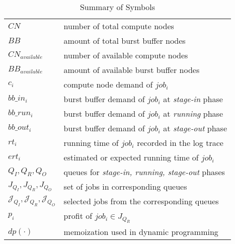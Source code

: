 

\begin{table}[h] 
        \renewcommand{\arraystretch}{1.3}
        \caption{Summary of Symbols}
        \label{Tab:Symbols}
        \centering
        \begin{tabular}{l|l}
                \hline
                $CN$ & number of total compute nodes \\
                $BB$ & amount of total burst buffer nodes \\
                $CN_{available}$ & number of available compute nodes \\
                $BB_{available}$ & amount of available burst buffer nodes \\
                $c_i$ & compute node demand of $job_i$ \\
                $bb\_in_i$ & burst buffer demand of $job_i$ at \textit{stage-in} phase \\
                $bb\_run_i$ & burst buffer demand of $job_i$ at \textit{running} phase \\
                $bb\_out_i$ & burst buffer demand of $job_i$ at \textit{stage-out} phase \\
                $rt_i$ & running time of $job_i$ recorded in the log trace \\
                $ert_i$ & estimated or expected running time of $job_i$ \\
                $Q_I, Q_R, Q_O$ & queues for \textit{stage-in, running, stage-out} phases \\
                $J_{Q_I}, J_{Q_R}, J_{Q_O}$ & set of jobs in corresponding queues \\
                $\mathcal{J}_{Q_I}, \mathcal{J}_{Q_R}, \mathcal{J}_{Q_O}$ & selected jobs from the corresponding queues\\
                $p_i$ & profit of $job_i \in J_{Q_R}$ \\
                $dp(\cdot)$ & memoization used in dynamic programming \\
                \hline
        \end{tabular}
\end{table}

